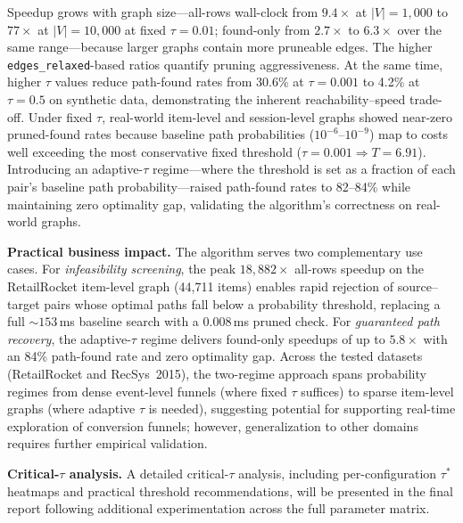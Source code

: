 Speedup grows with graph size---all-rows wall-clock from $9.4\times$ at $|V|=1{,}000$ to $77\times$ at $|V|=10{,}000$ at fixed $\tau=0.01$; found-only from $2.7\times$ to $6.3\times$ over the same range---because larger graphs contain more pruneable edges. The higher \texttt{edges\_relaxed}-based ratios quantify pruning aggressiveness. At the same time, higher $\tau$ values reduce path-found rates from 30.6\% at $\tau=0.001$ to 4.2\% at $\tau=0.5$ on synthetic data, demonstrating the inherent reachability--speed trade-off. Under fixed $\tau$, real-world item-level and session-level graphs showed near-zero pruned-found rates because baseline path probabilities ($10^{-6}$--$10^{-9}$) map to costs well exceeding the most conservative fixed threshold ($\tau=0.001 \Rightarrow T=6.91$). Introducing an adaptive-$\tau$ regime---where the threshold is set as a fraction of each pair's baseline path probability---raised path-found rates to 82--84\% while maintaining zero optimality gap, validating the algorithm's correctness on real-world graphs.

\textbf{Practical business impact.} The algorithm serves two complementary use cases. For \emph{infeasibility screening}, the peak $18{,}882\times$ all-rows speedup on the RetailRocket item-level graph (44,711 items) enables rapid rejection of source--target pairs whose optimal paths fall below a probability threshold, replacing a full ${\sim}153$\,ms baseline search with a $0.008$\,ms pruned check. For \emph{guaranteed path recovery}, the adaptive-$\tau$ regime delivers found-only speedups of up to $5.8\times$ with an 84\% path-found rate and zero optimality gap. Across the tested datasets (RetailRocket and RecSys~2015), the two-regime approach spans probability regimes from dense event-level funnels (where fixed $\tau$ suffices) to sparse item-level graphs (where adaptive $\tau$ is needed), suggesting potential for supporting real-time exploration of conversion funnels; however, generalization to other domains requires further empirical validation.

\textbf{Critical-$\tau$ analysis.} A detailed critical-$\tau$ analysis, including per-configuration $\tau^*$ heatmaps and practical threshold recommendations, will be presented in the final report following additional experimentation across the full parameter matrix.
